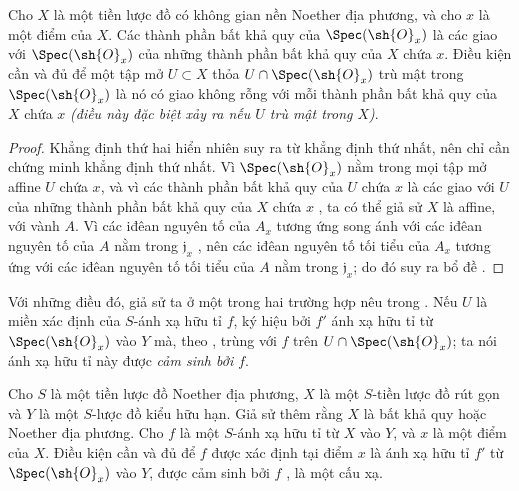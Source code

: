 \documentclass[oneside]{amsart}
\newcommand{\oldpage}[2][]{{\marginnote{\normalfont\textbf{#1}~|~#2}}\ignorespaces}
\let\EGAOriginalLabel\label
\renewcommand{\label}[1]{\phantomsection\EGAOriginalLabel{#1}}
\begin{document}
\begin{lemma}[7.2.8.1]
\label{I.7.2.8.1}
Cho $X$ là một tiền lược đồ có không gian nền Noether địa phương, và cho $x$ là một điểm của $X$.
Các thành phần bất khả quy của $\Spec(\sh{O}_x)$ là các giao với $\Spec(\sh{O}_x)$ của những thành phần bất khả quy của $X$ chứa $x$.
Điều kiện cần và đủ để một tập mở $U\subset X$ thỏa $U\cap\Spec(\sh{O}_x)$ trù mật trong $\Spec(\sh{O}_x)$ là nó có giao không rỗng với mỗi thành phần bất khả quy của $X$ chứa $x$ \emph{(điều này đặc biệt xảy ra nếu $U$ \emph{trù mật} trong $X$)}.
\end{lemma}

\begin{proof}
Khẳng định thứ hai hiển nhiên suy ra từ khẳng định thứ nhất, nên chỉ cần chứng minh khẳng định thứ nhất.
Vì $\Spec(\sh{O}_x)$ nằm trong mọi tập mở affine $U$ chứa $x$, và vì các thành phần bất khả quy của $U$ chứa $x$ là các giao với $U$ của những thành phần bất khả quy của $X$ chứa $x$ , ta có thể giả sử $X$ là affine, với vành $A$.
Vì các iđêan nguyên tố của $A_x$ tương ứng song ánh với các iđêan nguyên tố
\oldpage[I]{161}
của $A$ nằm trong $\mathfrak{j}_x$ , nên các iđêan nguyên tố tối tiểu của $A_x$ tương ứng với các iđêan nguyên tố tối tiểu của $A$ nằm trong $\mathfrak{j}_x$; do đó suy ra bổ đề .
\end{proof}

Với những điều đó, giả sử ta ở một trong hai trường hợp nêu trong .
Nếu $U$ là miền xác định của $S$-ánh xạ hữu tỉ $f$, ký hiệu bởi $f'$ ánh xạ hữu tỉ từ $\Spec(\sh{O}_x)$ vào $Y$ mà, theo , trùng với $f$ trên $U\cap\Spec(\sh{O}_x)$; ta nói ánh xạ hữu tỉ này được \emph{cảm sinh bởi $f$}.

\begin{proposition}[7.2.9]
\label{I.7.2.9}
Cho $S$ là một tiền lược đồ Noether địa phương, $X$ là một $S$-tiền lược đồ rút gọn và $Y$ là một $S$-lược đồ kiểu hữu hạn.
Giả sử thêm rằng $X$ là bất khả quy hoặc Noether địa phương.
Cho $f$ là một $S$-ánh xạ hữu tỉ từ $X$ vào $Y$, và $x$ là một điểm của $X$.
Điều kiện cần và đủ để $f$ được xác định tại điểm $x$ là ánh xạ hữu tỉ $f'$ từ $\Spec(\sh{O}_x)$ vào $Y$, được cảm sinh bởi $f$ , là một cấu xạ.
\end{proposition}
\end{document}

